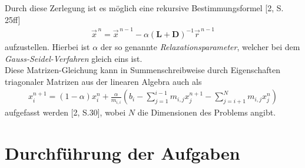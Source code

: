 \documentclass[12pt,a4paper,titlepage,headinclude,bibtotoc]{scrartcl}
\begin{document}
Durch diese Zerlegung ist es möglich eine rekursive Bestimmungsformel [2, S. 25ff]
\begin{align*}
\vec{x}^{\,n} = \vec{x}^{\,n-1} - \alpha(\boldsymbol{L}+\boldsymbol{D})^{-1} \vec{r}^{\,n-1}
\end{align*}
aufzustellen. Hierbei ist $\alpha$ der so genannte \textit{Relaxationsparameter}, welcher bei dem \textit{Gauss-Seidel-Verfahren} gleich eins ist.\\
Diese Matrizen-Gleichung kann in Summenschreibweise durch Eigenschaften triagonaler Matrizen aus der linearen Algebra auch als
\begin{align}
\label{eq:sor}
x^{n+1}_i = (1-\alpha)x^{n}_i + \frac{\alpha}{m_{i,i}} \left(b_i - \sum\limits_{j=1}^{i-1} m_{i,j} x^{n+1}_j - \sum\limits_{j=i+1}^{N} m_{i,j} x^{n}_j \right)  
\end{align}
aufgefasst werden [2, S.30], wobei $N$ die Dimensionen des Problems angibt.

\section{Durchführung der Aufgaben}
\end{document}
